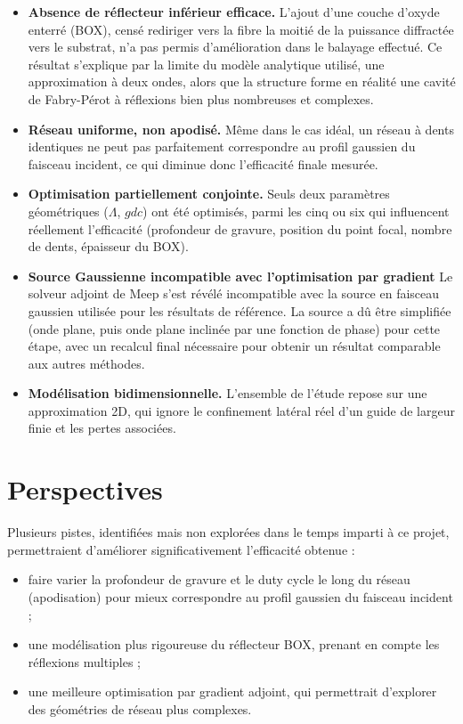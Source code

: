 \documentclass[a4paper,11pt]{report}
\begin{document}
\begin{itemize}
    \item \textbf{Absence de réflecteur inférieur efficace.} L'ajout d'une couche d'oxyde enterré (BOX), censé rediriger vers la fibre la moitié de la puissance diffractée vers le substrat, n'a pas permis d'amélioration dans le balayage effectué. Ce résultat s'explique par la limite du modèle analytique utilisé, une approximation à deux ondes, alors que la structure forme en réalité une cavité de Fabry-Pérot à réflexions bien plus nombreuses et complexes.
    \item \textbf{Réseau uniforme, non apodisé.} Même dans le cas idéal, un réseau à dents identiques ne peut pas parfaitement correspondre au profil gaussien du faisceau incident, ce qui diminue donc l'efficacité finale mesurée.
    \item \textbf{Optimisation partiellement conjointe.} Seuls deux paramètres géométriques ($\Lambda$, $gdc$) ont été optimisés, parmi les cinq ou six qui influencent réellement l'efficacité (profondeur de gravure, position du point focal, nombre de dents, épaisseur du BOX).
    \item \textbf{Source Gaussienne incompatible avec l'optimisation par gradient} Le solveur adjoint de Meep s'est révélé incompatible avec la source en faisceau gaussien utilisée pour les résultats de référence. La source a dû être simplifiée (onde plane, puis onde plane inclinée par une fonction de phase) pour cette étape, avec un recalcul final nécessaire pour obtenir un résultat comparable aux autres méthodes.
    \item \textbf{Modélisation bidimensionnelle.} L'ensemble de l'étude repose sur une approximation 2D, qui ignore le confinement latéral réel d'un guide de largeur finie et les pertes associées.
\end{itemize}

\section{Perspectives}

Plusieurs pistes, identifiées mais non explorées dans le temps imparti à ce projet, permettraient d'améliorer significativement l'efficacité obtenue :

\begin{itemize}
    \item faire varier la profondeur de gravure et le duty cycle le long du réseau (apodisation) pour mieux correspondre au profil gaussien du faisceau incident ;
    \item une modélisation plus rigoureuse du réflecteur BOX, prenant en compte les réflexions multiples ;
    \item une meilleure optimisation par gradient adjoint, qui permettrait d'explorer des géométries de réseau plus complexes.
\end{itemize}
\end{document}

